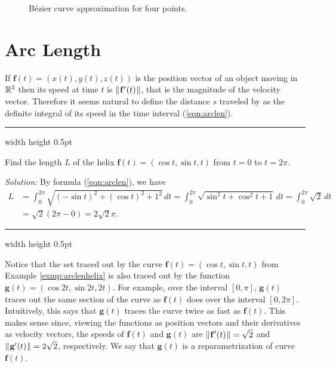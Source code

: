 \begin{figure}[h]
  \begin{center}
   
  \end{center}
 \caption[]{\quad B\'{e}zier curve approximation for four points.}
 \label{fig:bezier3}
 \end{figure}
 
\newpage
\section{Arc Length}

If $\mathbf{f}(t) = (x(t),y(t),z(t))$ is the position vector of an object moving in $\mathbb{R}^{3}$ then 
its speed at time $t$ is $\lVert\mspace{1mu}\mathbf{f}'(t)\mspace{1mu}\rVert$,
that is the magnitude  of the velocity vector.
Therefore it seems natural to define the distance $s$
traveled by as the definite integral of its speed in the time interval (\ref{eqn:arclen}).

\smallskip
\hrule width \textwidth height 0.5pt
\begin{exmp}\label{exmp:arclenhelix}
 Find the length $L$ of the helix $\mathbf{f}(t) = ( \cos t , \sin t , t )$ from $t = 0$ to $t =
 2\pi$.
 \smallskip
 \par\noindent \emph{Solution:} 
 By formula (\ref{eqn:arclen}), we have
 \begin{align*}
  L &= \int_{0}^{2\pi} \sqrt{(-\sin t)^2 + (\cos t)^2 + 1^2}\,dt 
  = \int_{0}^{2\pi} \sqrt{\sin^2 t + \cos^2 t + 1}\,dt 
  = \int_{0}^{2\pi} \sqrt{2}\,dt\\
  &= \sqrt{2} (2\pi - 0) = 2\sqrt{2}\pi.
 \end{align*}
\end{exmp}
\hrule width \textwidth height 0.5pt
\smallskip

Notice that the set traced out by the curve $\mathbf{f}(t) = (\cos t , \sin t , t)$ from Example
\ref{exmp:arclenhelix} is also traced out by the function $\mathbf{g}(t) = (\cos 2t , \sin 2t , 2t)$.
For example, over the interval $[0,\pi]$, $\mathbf{g}(t)$ traces out the same section of the curve as $\mathbf{f}(t)$
does over the interval $[0,2\pi]$. Intuitively, this says that $\mathbf{g}(t)$ traces the curve twice as fast as
$\mathbf{f}(t)$. This makes sense since, viewing the functions as position vectors and their derivatives as velocity
vectors, the speeds of $\mathbf{f}(t)$ and $\mathbf{g}(t)$ are $\lVert\mspace{1mu}\mathbf{f}'(t)\mspace{1mu}\rVert = \sqrt{2}$ and
$\lVert\mspace{1mu}\mathbf{g}'(t)\mspace{1mu}\rVert = 2\sqrt{2}$, respectively. 
We say that $\mathbf{g}(t)$ is a reparametrization of curve $\mathbf{f}(t)$.

